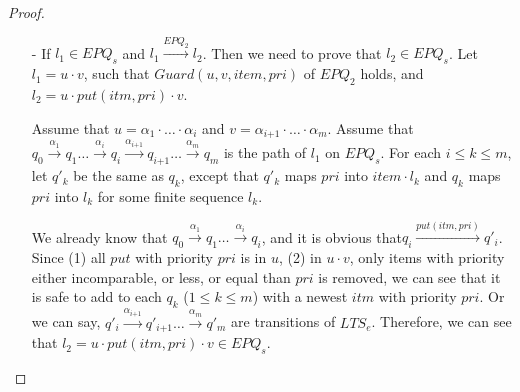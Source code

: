 \begin {proof}
\begin{itemize}
    We already know that $q_0 \xrightarrow{\alpha_1} q_1 \ldots \xrightarrow{\alpha_i} q_i$, and it is obvious that $q_i \xrightarrow{\textit{put}(\textit{itm},\textit{pri})} q'_i$. Since (1) all $\textit{put}$ with priority $\textit{pri}$ is in $u$, and (2) in $u \cdot v$, only items with priority either incomparable, or less, or equal than $\textit{pri}$ is removed, we can see that it is safe to add to each $q_k$ ($1 \leq k \leq j$) with a newest $\textit{itm}$ with priority $\textit{pri}$. Or we can say, $q'_i \xrightarrow{\alpha_{\textit{i+1}}} q'_{\textit{i+1}} \ldots \xrightarrow{\alpha_j} q'_j$ are transitions of $\textit{LTS}_e$. Since $\textit{matched-C}(u \cdot v)$ holds, we can see that $q_j$ maps each priority that is smaller than $\textit{pri}$ into $\epsilon$ and maps $\textit{pri}$ into $\epsilon$, and $q'_j$ maps each priority that is smaller than $\textit{pri}$ into $\epsilon$ and maps $\textit{pri}$ into $\textit{itm}$. Then, we can see that $q'_j \xrightarrow{\textit{rm}(\textit{itm})} q_j$. We already know that that $q_j \xrightarrow{\alpha_{\textit{j+1}}} q_{\textit{j+1}} \ldots \xrightarrow{\alpha_m} q_m$. Therefore, we can see that $l_2 = u \cdot \textit{put}(\textit{itm},\textit{pri}) \cdot v \cdot \textit{rm}(\textit{itm}) \in \textit{EPQ}_s$.

\item[-] If $l_1 \in \textit{EPQ}_s$ and $l_1 \xrightarrow{\textit{EPQ}_2} l_2$. Then we need to prove that $l_2 \in \textit{EPQ}_s$. Let $l_1 = u \cdot v$, such that $\textit{Guard}(u,v,\textit{item},\textit{pri})$ of $\textit{EPQ}_2$ holds, and $l_2 = u \cdot \textit{put}(\textit{itm},\textit{pri}) \cdot v$.

    Assume that $u = \alpha_1 \cdot \ldots \cdot \alpha_i$ and $v = \alpha_{\textit{i+1}} \cdot \ldots \cdot \alpha_m$. Assume that $q_0 \xrightarrow{\alpha_1} q_1 \ldots \xrightarrow{\alpha_i} q_i \xrightarrow{\alpha_{\textit{i+1}}} q_{\textit{i+1}} \ldots  \xrightarrow{\alpha_m} q_m$ is the path of $l_1$ on $\textit{EPQ}_s$. For each $i \leq k \leq m$, let $q'_k$ be the same as $q_k$, except that $q'_k$ maps $\textit{pri}$ into $\textit{item} \cdot l_k$ and $q_k$ maps $\textit{pri}$ into $l_k$ for some finite sequence $l_k$.

    We already know that $q_0 \xrightarrow{\alpha_1} q_1 \ldots \xrightarrow{\alpha_i} q_i$, and it is obvious that$q_i \xrightarrow{\textit{put}(\textit{itm},\textit{pri})} q'_i$. Since (1) all $\textit{put}$ with priority $\textit{pri}$ is in $u$, (2) in $u \cdot v$, only items with priority either incomparable, or less, or equal than $\textit{pri}$ is removed, we can see that it is safe to add to each $q_k$ ($1 \leq k \leq m$) with a newest $\textit{itm}$ with priority $\textit{pri}$. Or we can say, $q'_i \xrightarrow{\alpha_{\textit{i+1}}} q'_{\textit{i+1}} \ldots \xrightarrow{\alpha_m} q'_m$ are transitions of $\textit{LTS}_e$. Therefore, we can see that $l_2 = u \cdot \textit{put}(\textit{itm},\textit{pri}) \cdot v \in \textit{EPQ}_s$.


\end{itemize}
\end{proof}

